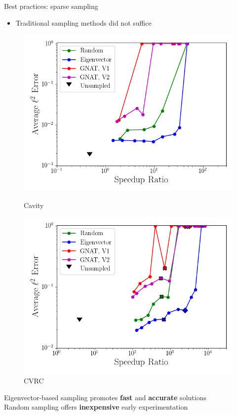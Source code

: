 \documentclass[]{beamer}
\begin{document}
\begin{frame}{Best practices: sparse sampling}
	\begin{itemize}
		\item Traditional sampling methods did not suffice
	\end{itemize}
	\begin{figure}
		\begin{minipage}{0.49\linewidth}
			\includegraphics[width=0.99\linewidth]{Images/experiments/2d_cavity/sampled_dt2p5e-6_Average_errorRaw_pareto.png}
			\caption*{Cavity}
		\end{minipage}
		\begin{minipage}{0.49\linewidth}
			\includegraphics[width=0.99\linewidth]{Images/experiments/cvrc/sampled_dt5e-7_Average_errorRaw_pareto.png}
			\caption*{CVRC}
		\end{minipage}
	\end{figure}
	\begin{tcolorbox}[colframe=blue!50!white,halign=center]
		Eigenvector-based sampling promotes \textbf{fast} and \textbf{accurate} solutions \\
		Random sampling offers \textbf{inexpensive} early experimentation
	\end{tcolorbox}
\end{frame}
\end{document}
